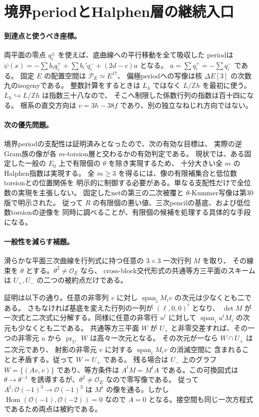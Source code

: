 \section{境界periodとHalphen層の継続入口}

\paragraph{到達点と使うべき座標。}
両平面の零点 $q_i^\pm$ を使えば、底曲線への平行移動を全て吸収した
periodは $\psi(x)=-\sum b_iq_i^++\sum b_i'q_i^-+(2d-c)a$ となる。
$a=\sum q_i^+=-\sum q_i^-$ である。
固定 $E$ の配置空間は $\mathcal P_E\simeq E^{17}$、
偏極periodへの写像は核 $\Delta E[3]$ の次数九のisogenyである。
整数計算をするときは $L_h$ ではなく $L/\mathbb Zh$ を最初に使う。
$L_h\hookrightarrow L/\mathbb Zh$ は指数三十八なので、
そこへ制限した係数行列の指数は百十四になる。
根系の直交方向は $v=3h-38f$ であり、別の独立なねじれ方向ではない。

\paragraph{次の優先問題。}
境界periodの支配性は証明済みとなったので、次の有効な目標は、
実際の逆Gram族の像が各 $m$-torsion層と交わるかの有効判定である。
現状では、ある固定した一般の $E_0$ 上で有限個の $\theta$ を除き実現するため、
十分大きい全 $m$ のHalphen指数は実現する。
全 $m\ge3$ を得るには、像の有限補集合と低位数torsionとの位置関係を
明示的に制御する必要がある。単なる支配性だけで全位数の実現を主張しない。
固定したnetの第三の二次被覆と $\theta$-Kummer写像は第30版で明示された。
従って $R$ の有限個の悪い値、三次pencilの基底、および低位数torsionの逆像を
同時に調べることが、有限個の候補を処理する具体的な手段になる。

\paragraph{一般性を減らす補題。}
滑らかな平面三次曲線を行列式に持つ任意の $3\times3$ 一次行列 $M$ を取り、
その線束を $\theta$ とする。$\theta^2\ne\mathcal O_E$ なら、
cross-block交代形式の共通等方三平面のスキームは
$U_+,U_-$ の二つの被約点だけである。

証明は以下の通り。任意の非零列 $v$ に対し
$\operatorname{span}_i M_i v$ の次元は少なくとも二である。
さもなければ基底を変えた行列の一列が $(\ell,0,0)^t$ となり、
$\det M$ が一次式と二次式に分解する。同様に任意の非零行 $u^t$ に対して
$\operatorname{span}_i u^tM_i$ の次元も少なくとも二である。
共通等方三平面 $W$ が $U_+$ と非零交差すれば、その一つの非零元 $u$ から
$\operatorname{pr}_{U_-}W$ は高々一次元となる。
その次元が一なら $W\cap U_+$ は二次元であり、
射影の非零元 $v$ に対する $\operatorname{span}_iM_i v$ の消滅空間に
含まれることと矛盾する。従って $W=U_+$ である。
残る場合は $U_-$ 上のグラフ $W=\{(Av,v)\}$ であり、等方条件は
$A^tM=M^tA$ である。この可換図式は
$\theta\to\theta^{-1}$ を誘導するが、$\theta^2\ne\mathcal O_E$ なので零写像である。
従って $A^t:\mathcal O(-1)^3\to\mathcal O(-1)^3$ は
$M^t$ の像を通る。しかし $\operatorname{Hom}(\mathcal O(-1),\mathcal O(-2))=0$
なので $A=0$ となる。接空間も同じ一次方程式であるため両点は被約である。


